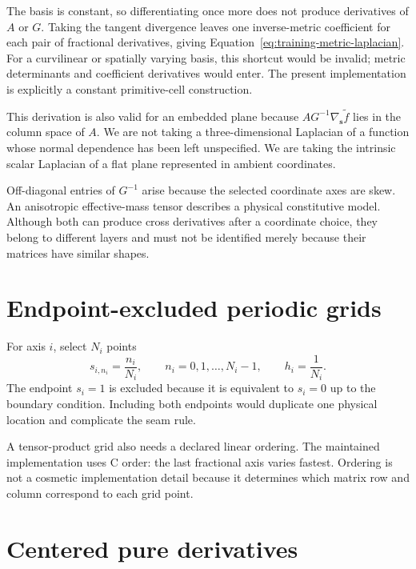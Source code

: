 The basis is constant, so differentiating once more does not produce derivatives
of $A$ or $G$. Taking the tangent divergence leaves one inverse-metric
coefficient for each pair of fractional derivatives, giving
Equation~\eqref{eq:training-metric-laplacian}. For a curvilinear or spatially
varying basis, this shortcut would be invalid; metric determinants and
coefficient derivatives would enter. The present implementation is explicitly
a constant primitive-cell construction.

This derivation is also valid for an embedded plane because
$AG^{-1}\nabla_{\mathbf s}\widetilde f$ lies in the column space of $A$. We are
not taking a three-dimensional Laplacian of a function whose normal dependence
has been left unspecified. We are taking the intrinsic scalar Laplacian of a
flat plane represented in ambient coordinates.

\begin{remark}
Off-diagonal entries of $G^{-1}$ arise because the selected coordinate axes are
skew. An anisotropic effective-mass tensor describes a physical constitutive
model. Although both can produce cross derivatives after a coordinate choice,
they belong to different layers and must not be identified merely because
their matrices have similar shapes.
\end{remark}

\section{Endpoint-excluded periodic grids}

For axis $i$, select $N_i$ points
\begin{equation}
  s_{i,n_i}=\frac{n_i}{N_i},
  \qquad
  n_i=0,1,\ldots,N_i-1,
  \qquad
  h_i=\frac{1}{N_i}.
  \label{eq:training-periodic-grid}
\end{equation}
The endpoint $s_i=1$ is excluded because it is equivalent to $s_i=0$ up to the
boundary condition. Including both endpoints would duplicate one physical
location and complicate the seam rule.

A tensor-product grid also needs a declared linear ordering. The maintained
implementation uses C order: the last fractional axis varies fastest. Ordering
is not a cosmetic implementation detail because it determines which matrix row
and column correspond to each grid point.

\section{Centered pure derivatives}

